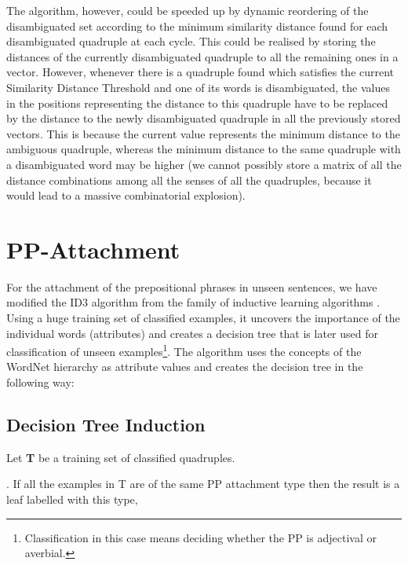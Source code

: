 The algorithm, however, could be speeded up by dynamic reordering of the disambiguated set according to the minimum similarity distance found for each disambiguated quadruple at each cycle. This could be realised by storing the distances of the currently disambiguated quadruple to all the remaining ones in a vector. However, whenever there is a quadruple found which satisfies the current Similarity Distance Threshold and one of its words is disambiguated, the values in the positions representing the distance to this quadruple have to be replaced by the distance to the newly disambiguated quadruple in all the previously stored vectors. This is because the current value represents the minimum distance to the ambiguous quadruple, whereas the minimum distance to the same quadruple with a disambiguated word may be higher (we cannot possibly store a matrix of all the distance combinations among all the senses of all the quadruples, because it would lead to a massive combinatorial explosion).



\section{PP-Attachment}



For the attachment of the prepositional phrases in unseen sentences, we have modified the ID3 algorithm \cite{BR91} from the family of inductive learning algorithms \cite{KO88}. Using a huge training set of classified examples, it uncovers the importance of the individual words (attributes) and creates a decision tree that is later used for classification of unseen examples\footnote{Classification in this case means deciding whether the PP is adjectival or averbial.}. The algorithm uses the concepts of the WordNet hierarchy as attribute values and creates the decision tree in the following way:

\subsection{Decision Tree Induction}

Let {\bf T} be a training set of classified quadruples.

. If all the examples in T are of the same PP attachment type then the result is a leaf labelled with this type,

